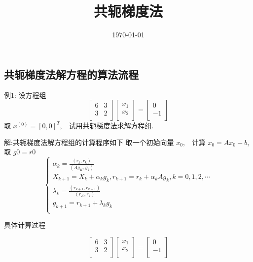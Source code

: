\documentclass{article}
\begin{document}
\title{共轭梯度法}
\author{}
\date{\today}
\maketitle
\subsection{共轭梯度法解方程的算法流程}

例1: 设方程组
\begin{equation}\label{eq:AB}
\begin{bmatrix}
6 & 3\\
3 & 2\\
\end{bmatrix}
\begin{bmatrix}
x_1\\
x_2\\
\end{bmatrix}
=\begin{bmatrix}
0\\
-1\\
\end{bmatrix}
\end{equation}
取 $x^{(0)}=[0,0]^T$,　试用共轭梯度法求解方程组.

解:共轭梯度法解方程组的计算程序如下
取一个初始向量 $x_0$,　计算 $x_0=Ax_0-b$, 取 $g0=r0$
\begin{equation}\label{eq:AC}
\left\{
\begin{array}{l}
\alpha_k = \frac{(r_k,r_k)}{(Ag_K,g_k)}\\
X_{k+1} = X_k+\alpha_k g_k,r_{k+1}=r_k+\alpha_kAg_k,k=0,1,2,\cdots\\
\lambda_k=\frac{(r_{k+1},r_{k+1})}{(r_K,r_k)}\\
g_{k+1}=r_{k+1}+\lambda_kg_k\\
\end{array}\right.
\end{equation}

具体计算过程

\begin{equation}
\begin{bmatrix}
6 & 3\\
3 & 2\\
\end{bmatrix}
\begin{bmatrix}
x_1\\
x_2\\
\end{bmatrix}
=\begin{bmatrix}
0\\
-1\\
\end{bmatrix}
\end{equation}
\end{document}
